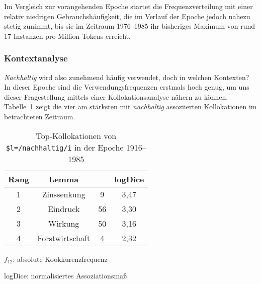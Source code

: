 \documentclass[
    german,
    a4paper,%
    12pt,%
    oneside,%
    toc=bibliography,
    final,
]{scrartcl}
\begin{document}
Im Vergleich zur vorangehenden Epoche startet die Frequenzverteilung mit einer relativ niedrigen Gebrauchshäufigkeit, die im Verlauf der Epoche jedoch nahezu stetig zunimmt, bis sie im Zeitraum 1976–1985 ihr bisheriges Maximum von rund 17 Instanzen pro Million Tokens erreicht.

\subsubsection{Kontextanalyse}

\textit{Nachhaltig} wird also zunehmend häufig verwendet, doch in welchen Kontexten? In dieser Epoche sind die Verwendungsfrequenzen erstmals hoch genug, um uns dieser Fragestellung mittels einer Kollokationsanalyse nähern zu können. Tabelle~\ref{tab:kollokationen-epoche3} zeigt die vier am stärksten mit \textit{nachhaltig} assoziierten Kollokationen im betrachteten Zeitraum.


\begin{table}[h!]
	\centering
	\renewcommand{\arraystretch}{1.5}
	
	\caption{Top-Kollokationen von \lstinline|$l=/nachhaltig/i| in der Epoche 1916–1985\protect\footnotemark}
	\label{tab:kollokationen-epoche3}
	
	\begin{threeparttable}
	
	\begin{tabular}{cccc}
	\textbf{Rang} & \textbf{Lemma} & \boldmath{$f_{12}$} & \textbf{logDice} \\ \hline
	1 & Zinssenkung & 9 & 3,47 \\ \hline
	2 & Eindruck & 56 & 3,30 \\ \hline
	3 & Wirkung & 50 & 3,16 \\ \hline
	4 & Forstwirtschaft & 4 & 2,32 \\ \hline
	\end{tabular} 
	
	\begin{tablenotes}
	\footnotesize
	\setlength{\itemindent}{-1.2em}
	\item $f_{12}$: absolute Kookkurenzfrequenz
	\item logDice: normalisiertes Assoziationsmaß
	\end{tablenotes}
	
	\end{threeparttable}
\end{table}
\end{document}
